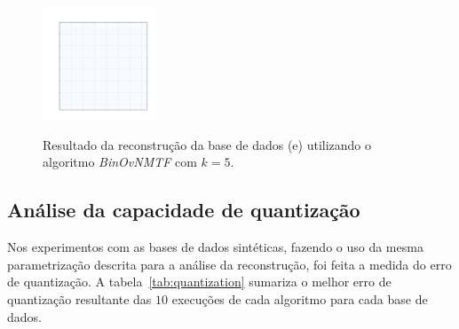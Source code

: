 \documentclass[
    12pt,                %
    oneside,            %
    a4paper,            %
    english,            %
    brazil                %
    ]{abntex2ppgsi}
\begin{document}
\begin{figure}[H]
\centering
    \caption{Resultado da reconstrução da base de dados (e) utilizando o algoritmo \textit{BinOvNMTF} com $k = 5$.}
    \includegraphics[width=0.3\textwidth]{img/e-reconstruction-2-binovnmtf.png}
    \label{fig:reconstruction-2:binovnmtf}
\end{figure}

\subsection{Análise da capacidade de quantização}

Nos experimentos com as bases de dados sintéticas, fazendo o uso da mesma parametrização descrita para a análise da reconstrução, foi feita a medida do erro de quantização. A tabela~\ref{tab:quantization} sumariza o melhor erro de quantização resultante das $10$ execuções de cada algoritmo para cada base de dados.

\end{document}
